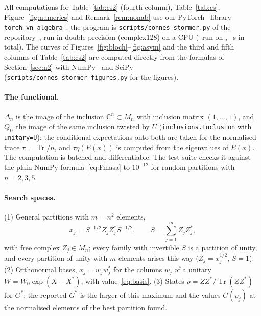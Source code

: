 \documentclass[11pt]{article}
\DeclareMathOperator{\Tr}{Tr}
\newcommand{\C}{\mathbb{C}}
\theoremstyle{plain}
\theoremstyle{definition}
\theoremstyle{remark}
\begin{document}
All computations for Table~\ref{tab:cs2} (fourth column), Table~\ref{tab:cs}, Figure~\ref{fig:numerics} and
Remark~\ref{rem:nonab} use our PyTorch~\cite{paszke2019} library \texttt{torch\_\allowbreak vn\_\allowbreak algebra}~\cite{lib};
the program is \texttt{scripts/\allowbreak connes\_\allowbreak stormer.py} of the repository~\cite{lib}, run in double precision
(complex128) on a CPU (\CSMode\ run on \CSDevice, \CSSeconds~s in total). The curves of Figures~\ref{fig:bloch}--\ref{fig:asym}
and the third and fifth columns of Table~\ref{tab:cs2} are computed directly from the formulas of Section~\ref{sec:n2} with
NumPy~\cite{harris2020} and SciPy~\cite{virtanen2020} (\texttt{scripts/\allowbreak connes\_\allowbreak stormer\_\allowbreak figures.py}
for the figures).

\paragraph{The functional.} $\Delta_n$ is the image of the inclusion $\C^n\subset M_n$ with inclusion matrix $(1,\dots,1)$,
and $Q_U$ the image of the same inclusion twisted by $U$ (\texttt{inclusions.Inclusion} with \texttt{unitary=U}); the
conditional expectations onto both are taken for the normalised trace $\tau=\Tr/n$, and $\tau\eta(E(x))$ is computed from the
eigenvalues of $E(x)$. The computation is batched and differentiable. The test suite checks it against the plain NumPy
formula~\eqref{eq:Fmasa} to $10^{-12}$ for random partitions with $n=2,3,5$.

\paragraph{Search spaces.} (1) General partitions with $m=n^2$ elements,
\[
  x_j=S^{-1/2}Z_jZ_j^*S^{-1/2},\qquad S=\sum_{j=1}^mZ_jZ_j^*,
\]
with free complex $Z_j\in M_n$; every family with invertible $S$ is a partition of unity, and every partition of unity with
$m$ elements arises this way ($Z_j=x_j^{1/2}$, $S=1$). (2) Orthonormal bases, $x_j=w_jw_j^*$ for the columns $w_j$ of a
unitary $W=W_0\exp(X-X^*)$, with value~\eqref{eq:basis}. (3) States $\rho=ZZ^*/\Tr(ZZ^*)$ for $G^*$; the reported $G^*$ is the
larger of this maximum and the values $G(\rho_j)$ at the normalised elements of the best partition found.
\end{document}
